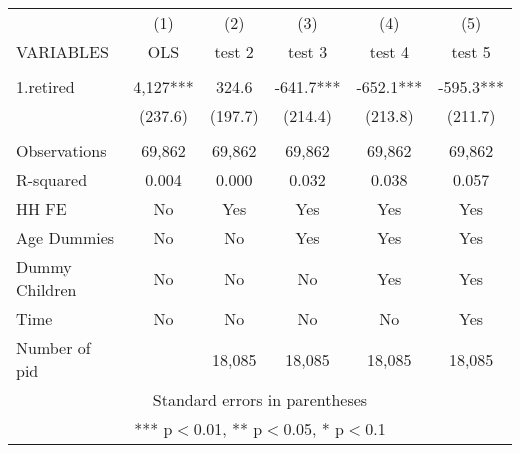 \begin{tabular}{lccccc} \hline
 & (1) & (2) & (3) & (4) & (5) \\
VARIABLES & OLS & test 2 & test 3 & test 4 & test 5 \\ \hline
 &  &  &  &  &  \\
1.retired & 4,127*** & 324.6 & -641.7*** & -652.1*** & -595.3*** \\
 & (237.6) & (197.7) & (214.4) & (213.8) & (211.7) \\
 &  &  &  &  &  \\
Observations & 69,862 & 69,862 & 69,862 & 69,862 & 69,862 \\
R-squared & 0.004 & 0.000 & 0.032 & 0.038 & 0.057 \\
HH FE & No & Yes & Yes & Yes & Yes \\
Age Dummies & No & No & Yes & Yes & Yes \\
Dummy Children & No & No & No & Yes & Yes \\
Time & No & No & No & No & Yes \\
 Number of pid &  & 18,085 & 18,085 & 18,085 & 18,085 \\ \hline
\multicolumn{6}{c}{ Standard errors in parentheses} \\
\multicolumn{6}{c}{ *** p$<$0.01, ** p$<$0.05, * p$<$0.1} \\
\end{tabular}
